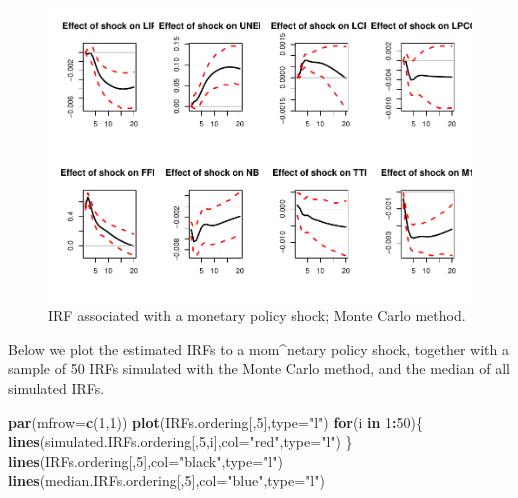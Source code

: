 \documentclass[
  12pt,
]{book}
\newenvironment{Shaded}{\begin{snugshade}}{\end{snugshade}}
\newcommand{\AttributeTok}[1]{\textcolor[rgb]{0.13,0.29,0.53}{#1}}
\newcommand{\ControlFlowTok}[1]{\textcolor[rgb]{0.13,0.29,0.53}{\textbf{#1}}}
\newcommand{\DecValTok}[1]{\textcolor[rgb]{0.00,0.00,0.81}{#1}}
\newcommand{\FunctionTok}[1]{\textcolor[rgb]{0.13,0.29,0.53}{\textbf{#1}}}
\newcommand{\NormalTok}[1]{#1}
\newcommand{\OtherTok}[1]{\textcolor[rgb]{0.56,0.35,0.01}{#1}}
\newcommand{\SpecialCharTok}[1]{\textcolor[rgb]{0.81,0.36,0.00}{\textbf{#1}}}
\newcommand{\StringTok}[1]{\textcolor[rgb]{0.31,0.60,0.02}{#1}}
\theoremstyle{definition}
\theoremstyle{definition}
\theoremstyle{definition}
\theoremstyle{definition}
\theoremstyle{remark}
\begin{document}
\begin{figure}
\includegraphics[width=0.95\linewidth]{IdentifStructShocks_files/figure-latex/inference1-1} \caption{IRF associated with a monetary policy shock; Monte Carlo method.}\label{fig:inference1}
\end{figure}

\begin{Shaded}
\end{Shaded}

Below we plot the estimated IRFs to a mom\^{}netary policy shock, together with a sample of 50 IRFs simulated with the Monte Carlo method, and the median of all simulated IRFs.

\begin{Shaded}
\begin{Highlighting}[]
\FunctionTok{par}\NormalTok{(}\AttributeTok{mfrow=}\FunctionTok{c}\NormalTok{(}\DecValTok{1}\NormalTok{,}\DecValTok{1}\NormalTok{))}
\FunctionTok{plot}\NormalTok{(IRFs.ordering[,}\DecValTok{5}\NormalTok{],}\AttributeTok{type=}\StringTok{"l"}\NormalTok{)}
\ControlFlowTok{for}\NormalTok{(i }\ControlFlowTok{in} \DecValTok{1}\SpecialCharTok{:}\DecValTok{50}\NormalTok{)\{}
  \FunctionTok{lines}\NormalTok{(simulated.IRFs.ordering[,}\DecValTok{5}\NormalTok{,i],}\AttributeTok{col=}\StringTok{"red"}\NormalTok{,}\AttributeTok{type=}\StringTok{"l"}\NormalTok{)}
\NormalTok{\}}
\FunctionTok{lines}\NormalTok{(IRFs.ordering[,}\DecValTok{5}\NormalTok{],}\AttributeTok{col=}\StringTok{"black"}\NormalTok{,}\AttributeTok{type=}\StringTok{"l"}\NormalTok{)}
\FunctionTok{lines}\NormalTok{(median.IRFs.ordering[,}\DecValTok{5}\NormalTok{],}\AttributeTok{col=}\StringTok{"blue"}\NormalTok{,}\AttributeTok{type=}\StringTok{"l"}\NormalTok{)}
\end{Highlighting}
\end{Shaded}
\end{document}
